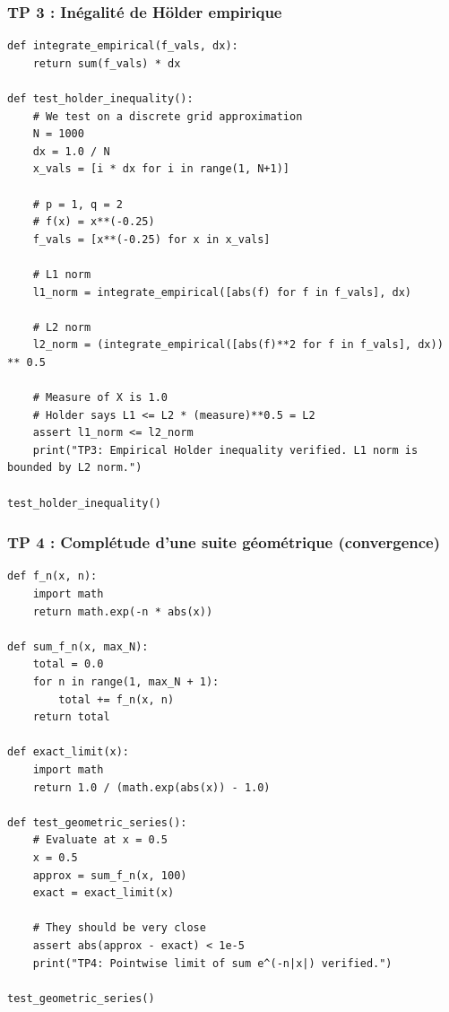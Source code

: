 \documentclass[11pt,a4paper]{article}
\begin{document}
\subsubsection*{TP 3 : Inégalité de Hölder empirique}
\begin{lstlisting}
def integrate_empirical(f_vals, dx):
    return sum(f_vals) * dx

def test_holder_inequality():
    # We test on a discrete grid approximation
    N = 1000
    dx = 1.0 / N
    x_vals = [i * dx for i in range(1, N+1)]

    # p = 1, q = 2
    # f(x) = x**(-0.25)
    f_vals = [x**(-0.25) for x in x_vals]

    # L1 norm
    l1_norm = integrate_empirical([abs(f) for f in f_vals], dx)

    # L2 norm
    l2_norm = (integrate_empirical([abs(f)**2 for f in f_vals], dx)) ** 0.5

    # Measure of X is 1.0
    # Holder says L1 <= L2 * (measure)**0.5 = L2
    assert l1_norm <= l2_norm
    print("TP3: Empirical Holder inequality verified. L1 norm is bounded by L2 norm.")

test_holder_inequality()
\end{lstlisting}

\subsubsection*{TP 4 : Complétude d'une suite géométrique (convergence)}
\begin{lstlisting}
def f_n(x, n):
    import math
    return math.exp(-n * abs(x))

def sum_f_n(x, max_N):
    total = 0.0
    for n in range(1, max_N + 1):
        total += f_n(x, n)
    return total

def exact_limit(x):
    import math
    return 1.0 / (math.exp(abs(x)) - 1.0)

def test_geometric_series():
    # Evaluate at x = 0.5
    x = 0.5
    approx = sum_f_n(x, 100)
    exact = exact_limit(x)

    # They should be very close
    assert abs(approx - exact) < 1e-5
    print("TP4: Pointwise limit of sum e^(-n|x|) verified.")

test_geometric_series()
\end{lstlisting}
\end{document}
